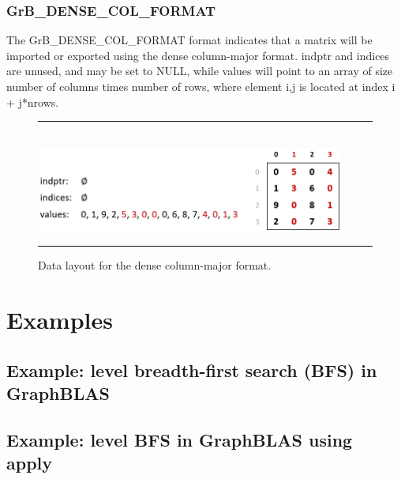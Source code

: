 \subsection{{\sf GrB\_DENSE\_COL\_FORMAT}}
The {\sf GrB\_DENSE\_COL\_FORMAT} format indicates that a matrix will be imported
or exported using the dense column-major format.  {\sf indptr} and {\sf indices} are unused,
and may be set to NULL, while {\sf values} will point to an array of size number of columns
times number of rows, where element i,j is located at index i + j*nrows.\\

\begin{figure}[h]
    \hrule
    \begin{center}
        ~\\
        \includegraphics[width=4in]{GrB_DENSE_COLUMN_FORMAT.png}
    \end{center}
    \vspace{-1em}
    \caption{Data layout for the dense column-major format.}
    \label{Fig:formats}
    \hrule
\end{figure}


\chapter{Examples}
\label{Chp:Examples}

\pagebreak
\nolinenumbers
\section{Example: level breadth-first search (BFS) in GraphBLAS}
{\scriptsize

}
\vfill

\pagebreak
\nolinenumbers
\section{Example: level BFS in GraphBLAS using apply}
{\scriptsize

}
\vfill

